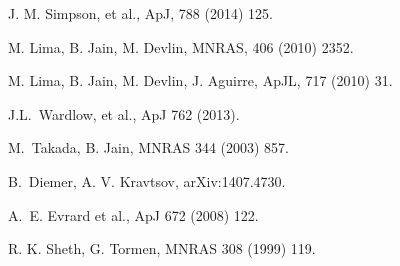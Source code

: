 \documentclass[12pt]{article}
\begin{document}
\begin{thebibliography}{9}


{\footnotesize

J. M. Simpson, et al.,
ApJ, 788 (2014) 125.


M. Lima, B. Jain, M. Devlin, 
MNRAS, 406 (2010) 2352.

M. Lima, B. Jain, M. Devlin,  J. Aguirre, 
ApJL, 717 (2010) 31.

J.L.~Wardlow, et al.,
ApJ 762 (2013). 

M.~Takada, B. Jain,
MNRAS 344 (2003) 857. 

B.~Diemer, A. V. Kravtsov,
arXiv:1407.4730. 

A.~E. Evrard et al.,
ApJ 672 (2008) 122.

R. K. Sheth, G. Tormen, 
 MNRAS  308 (1999) 119.
}
\end{thebibliography} 
\end{document}
